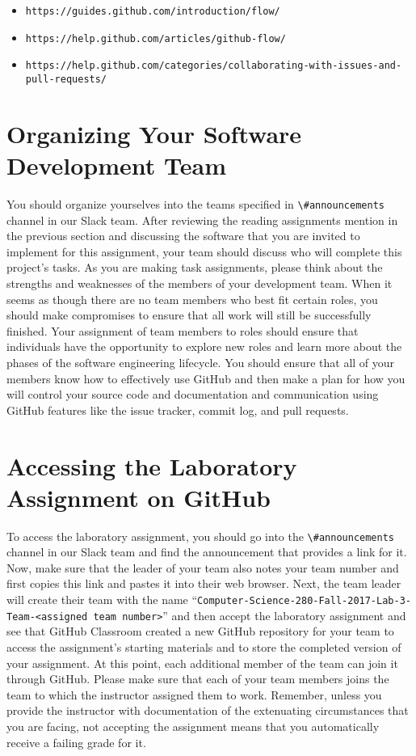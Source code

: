 \documentclass[11pt]{article}
\newcommand{\command}[1]{``\lstinline{#1}''}
\newcommand{\url}[1]{\lstinline{#1}}
\newcommand{\channel}[1]{\lstinline{#1}}
\begin{document}
\begin{itemize}
  \item \url{https://guides.github.com/introduction/flow/}
  \item \url{https://help.github.com/articles/github-flow/}
  \item \url{https://help.github.com/categories/collaborating-with-issues-and-pull-requests/}
\end{itemize}

\vspace*{-.5em}

\section*{Organizing Your Software Development Team}

You should organize yourselves into the teams specified in \channel{\#announcements} channel in our Slack team. After
reviewing the reading assignments mention in the previous section and discussing the software that you are invited to
implement for this assignment, your team should discuss who will complete this project's tasks. As you are making task
assignments, please think about the strengths and weaknesses of the members of your development team. When it seems as
though there are no team members who best fit certain roles, you should make compromises to ensure that all work will
still be successfully finished. Your assignment of team members to roles should ensure that individuals have the
opportunity to explore new roles and learn more about the phases of the software engineering lifecycle. You should
ensure that all of your members know how to effectively use GitHub and then make a plan for how you will control your
source code and documentation and communication using GitHub features like the issue tracker, commit log, and pull
requests.

\section*{Accessing the Laboratory Assignment on GitHub}

To access the laboratory assignment, you should go into the \channel{\#announcements} channel in our Slack team and find
the announcement that provides a link for it. Now, make sure that the leader of your team also notes your team number
and first copies this link and pastes it into their web browser. Next, the team leader will create their team with the
name \command{Computer-Science-280-Fall-2017-Lab-3-Team-<assigned team number>} and then accept the laboratory
assignment and see that GitHub Classroom created a new GitHub repository for your team to access the assignment's
starting materials and to store the completed version of your assignment. At this point, each additional member of the
team can join it through GitHub. Please make sure that each of your team members joins the team to which the instructor
assigned them to work. Remember, unless you provide the instructor with documentation of the extenuating circumstances
that you are facing, not accepting the assignment means that you automatically receive a failing grade for it.
\end{document}
